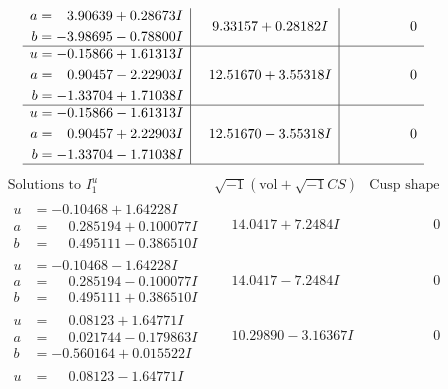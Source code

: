 \documentclass[1p]{elsarticle_modified}
\theoremstyle{definition}
\newcommand{\I}{\sqrt{-1}}
\begin{document}
$$\begin{array}{c|c|c}
\begin{aligned}
a &= \phantom{-}3.90639 + 0.28673 I \\
b &= -3.98695 - 0.78800 I\end{aligned}
 & \phantom{-}9.33157 + 0.28182 I & \phantom{-0.000000 } 0 \\ \hline\begin{aligned}
u &= -0.15866 + 1.61313 I \\
a &= \phantom{-}0.90457 - 2.22903 I \\
b &= -1.33704 + 1.71038 I\end{aligned}
 & \phantom{-}12.51670 + 3.55318 I & \phantom{-0.000000 } 0 \\ \hline\begin{aligned}
u &= -0.15866 - 1.61313 I \\
a &= \phantom{-}0.90457 + 2.22903 I \\
b &= -1.33704 - 1.71038 I\end{aligned}
 & \phantom{-}12.51670 - 3.55318 I & \phantom{-0.000000 } 0\\
 \hline 
 \end{array}$$\newpage$$\begin{array}{c|c|c}  
\text{Solutions to }I^u_{1}& \I (\text{vol} + \sqrt{-1}CS) & \text{Cusp shape}\\
 \hline 
\begin{aligned}
u &= -0.10468 + 1.64228 I \\
a &= \phantom{-}0.285194 + 0.100077 I \\
b &= \phantom{-}0.495111 - 0.386510 I\end{aligned}
 & \phantom{-}14.0417 + 7.2484 I & \phantom{-0.000000 } 0 \\ \hline\begin{aligned}
u &= -0.10468 - 1.64228 I \\
a &= \phantom{-}0.285194 - 0.100077 I \\
b &= \phantom{-}0.495111 + 0.386510 I\end{aligned}
 & \phantom{-}14.0417 - 7.2484 I & \phantom{-0.000000 } 0 \\ \hline\begin{aligned}
u &= \phantom{-}0.08123 + 1.64771 I \\
a &= \phantom{-}0.021744 - 0.179863 I \\
b &= -0.560164 + 0.015522 I\end{aligned}
 & \phantom{-}10.29890 - 3.16367 I & \phantom{-0.000000 } 0 \\ \hline\begin{aligned}
u &= \phantom{-}0.08123 - 1.64771 I \\

\end{aligned}
\end{array}$$
\end{document}

